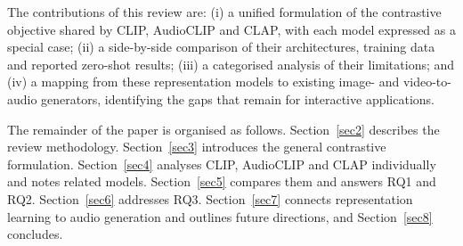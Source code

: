 The contributions of this review are: (i) a unified formulation of the contrastive objective shared by CLIP, AudioCLIP and CLAP, with each model expressed as a special case; (ii) a side-by-side comparison of their architectures, training data and reported zero-shot results; (iii) a categorised analysis of their limitations; and (iv) a mapping from these representation models to existing image- and video-to-audio generators, identifying the gaps that remain for interactive applications.

The remainder of the paper is organised as follows. Section~\ref{sec2} describes the review methodology. Section~\ref{sec3} introduces the general contrastive formulation. Section~\ref{sec4} analyses CLIP, AudioCLIP and CLAP individually and notes related models. Section~\ref{sec5} compares them and answers RQ1 and RQ2. Section~\ref{sec6} addresses RQ3. Section~\ref{sec7} connects representation learning to audio generation and outlines future directions, and Section~\ref{sec8} concludes.
